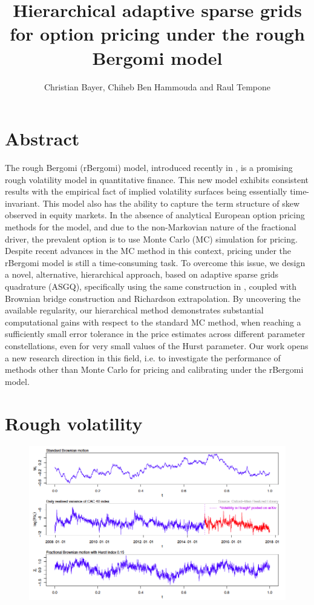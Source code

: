 \documentclass[ima, 20pt, portrait, plainboxedsections]{sciposter}
\title{Hierarchical adaptive sparse  grids for option pricing under the rough Bergomi model}
\author{Christian Bayer, Chiheb Ben Hammouda  and Raul Tempone}
\institute{King Abdullah University of Science and Technology (KAUST), Computer, Electrical and Mathematical Sciences \& Engineering Division (CEMSE), Saudi Arabia}
\begin{document}
\maketitle

\begin{multicols}{3}

\section*{Abstract} 
The rough Bergomi (rBergomi) model, introduced recently in  \cite{bayer2016pricing}, is a promising rough volatility model in quantitative finance. This new model exhibits consistent results with the empirical fact of implied volatility surfaces being essentially time-invariant. This model also has  the  ability to capture the term structure of skew observed in equity markets. In the absence of analytical European option pricing methods for the model, and due to the non-Markovian nature of the fractional driver, the prevalent option is to use Monte Carlo (MC) simulation for pricing. Despite recent advances in the MC method in this context, pricing under the rBergomi model is still a time-consuming task. To overcome this issue, we design a novel,  alternative, hierarchical approach, based on adaptive sparse grids quadrature (ASGQ), specifically using the same construction in \cite{haji2016multi}, coupled with Brownian bridge construction and Richardson extrapolation. By uncovering the available regularity,  our hierarchical method demonstrates substantial computational gains with respect to the standard MC method, when reaching a sufficiently small error tolerance in the price estimates across different parameter constellations, even for very small values of the Hurst  parameter. Our work opens a new research direction in this field, i.e. to investigate the performance of  methods  other than Monte Carlo for pricing and calibrating under the rBergomi model.

\section*{Rough volatility}
\begin{figure}[H]
 \begin{center}
\includegraphics[scale=0.75]{vol_rough}
 \end{center}
\end{figure}

\end{multicols}
\end{document}
